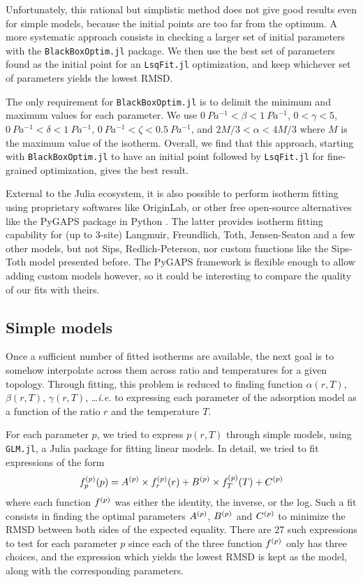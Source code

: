 \documentclass[main.tex]{subfiles}
\begin{document}
Unfortunately, this rational but simplistic method does not give good results even for simple models, because the initial points are too far from the optimum. A more systematic approach consists in checking a larger set of initial parameters with the \texttt{BlackBoxOptim.jl} package. We then use the best set of parameters found as the initial point for an \texttt{LsqFit.jl} optimization, and keep whichever set of parameters yields the lowest RMSD.

The only requirement for \texttt{BlackBoxOptim.jl} is to delimit the minimum and maximum values for each parameter. We use $\qty{0}{Pa^{-1}} < \beta < \qty{1}{Pa^{-1}}$, $0 < \gamma < 5$, $\qty{0}{Pa^{-1}} < \delta < \qty{1}{Pa^{-1}}$, $\qty{0}{Pa^{-1}} < \zeta < \qty{0.5}{Pa^{-1}}$, and $2M/3 < \alpha < 4M/3$ where $M$ is the maximum value of the isotherm. Overall, we find that this approach, starting with \texttt{BlackBoxOptim.jl} to have an initial point followed by \texttt{LsqFit.jl} for fine-grained optimization, gives the best result.

External to the Julia ecosystem, it is also possible to perform isotherm fitting using proprietary softwares like OriginLab, or other free open-source alternatives like the PyGAPS package in Python \autocite{pyGAPS}. The latter provides isotherm fitting capability for (up to 3-site) Langmuir, Freundlich, Toth, Jensen-Seaton and a few other models, but not Sips, Redlich-Peterson, nor custom functions like the Sips-Toth model presented before. The PyGAPS framework is flexible enough to allow adding custom models however, so it could be interesting to compare the quality of our fits with theirs.

\subsection{Simple models}

Once a sufficient number of fitted isotherms are available, the next goal is to somehow interpolate across them across \SiAl ratio and temperatures for a given topology. Through fitting, this problem is reduced to finding function $\alpha(r, T)$, $\beta(r, T)$, $\gamma(r, T)$, \ldots \textit{i.e.} to expressing each parameter of the adsorption model as a function of the \SiAl ratio $r$ and the temperature $T$.

For each parameter $p$, we tried to express $p(r, T)$ through simple models, using \texttt{GLM.jl}, a Julia package for fitting linear models. In detail, we tried to fit expressions of the form
\[f^{\left(p\right)}_p(p) = A^{\left(p\right)}\times f^{\left(p\right)}_r(r) + B^{\left(p\right)}\times f^{\left(p\right)}_T(T) + C^{\left(p\right)}\]
where each function $f^{\left(p\right)}$ was either the identity, the inverse, or the log. Such a fit consists in finding the optimal parameters $A^{\left(p\right)}$, $B^{\left(p\right)}$ and $C^{\left(p\right)}$ to minimize the RMSD between both sides of the expected equality. There are 27 such expressions to test for each parameter $p$ since each of the three function $f^{\left(p\right)}$ only has three choices, and the expression which yields the lowest RMSD is kept as the model, along with the corresponding parameters.
\end{document}
